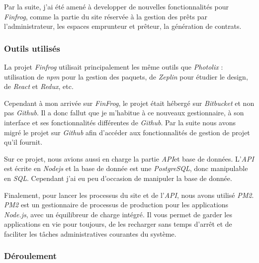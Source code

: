 \documentclass[12pt,a4paper]{article}
\begin{document}
  \bigskip

  Par la suite, j'ai été amené à developper de nouvelles fonctionnalités
  pour \emph{Finfrog}, comme la partie du site réservée à la gestion des
  prêts par l'administrateur, les espaces emprunteur et prêteur, la
  génération de contrats.

  \bigskip

  \subsubsection{Outils utilisés}\label{outils-utilisuxe9s-1}

  \bigskip

  La projet \emph{Finfrog} utilisait principalement les même outils que
  \emph{Photolix} : utilisation de \emph{npm} pour la gestion des paquets,
  de \emph{Zeplin} pour étudier le design, de \emph{React} et
  \emph{Redux}, etc.

  \bigskip

  Cependant à mon arrivée sur \emph{FinFrog}, le projet était hébergé sur
  \emph{Bitbucket} et non pas \emph{Github}. Il a donc fallut que je
  m'habitue à ce nouveaux gestionnaire, à son interface et ses
  fonctionnalités différentes de \emph{Github}. Par la suite nous avons
  migré le projet sur \emph{Github} afin d'accéder aux fonctionnalités de
  gestion de projet qu'il fournit.

  \bigskip

  Sur ce projet, nous avions aussi en charge la partie \emph{API}et base
  de données. L'\emph{API} est écrite en \emph{Nodejs} et la base de
  donnée est une \emph{PostgreSQL}, donc manipulable en \emph{SQL}.
  Cependant j'ai eu peu d'occasion de manipuler la base de donnée.

  \bigskip

  Finalement, pour lancer les processus du site et de l'\emph{API}, nous
  avons utilisé \emph{PM2}. \emph{PM2} est un gestionnaire de processus de
  production pour les applications \emph{Node.js}, avec un équilibreur de
  charge intégré. Il vous permet de garder les applications en vie pour
  toujours, de les recharger sans temps d'arrêt et de faciliter les tâches
  administratives courantes du système.

  \bigskip

  \subsubsection{Déroulement}\label{duxe9roulement-1}
\end{document}

